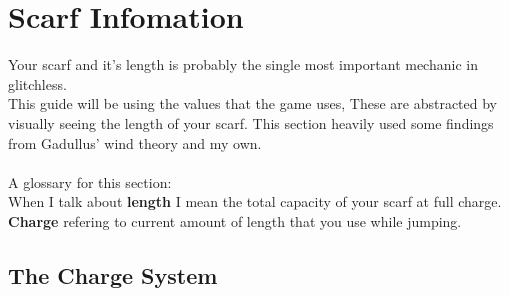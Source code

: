 \section{Scarf Infomation}

Your scarf and it's length is probably the single most important mechanic in glitchless.\\
This guide will be using the values that the game uses, These are abstracted by visually 
seeing the length of your scarf. This section heavily used some findings from Gadullus' wind theory \autocite{winds_speedrun_guide} 
and my own.\\
\\
A glossary for this section:\\
When I talk about \textbf{length} I mean the total capacity of your scarf at full charge.\\
\textbf{Charge} refering to current amount of length that you use while jumping.
\subsection*{The Charge System}


